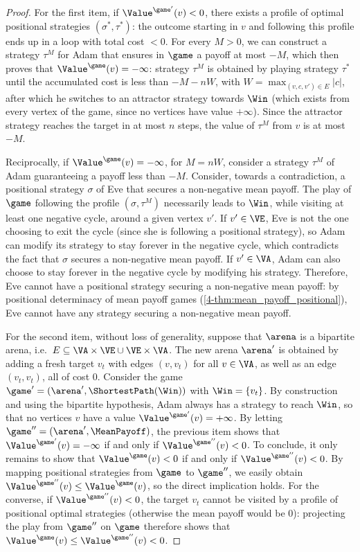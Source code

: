 \begin{proof}
  For the first item, if $\Value^{\game'}(v)<0$, there exists a
  profile of optimal positional strategies $(\sigma^*,\tau^*)$: the
  outcome starting in $v$ and following this profile ends up in a loop
  with total cost $<0$. For every $M>0$, we can construct a strategy
  $\tau^M$ for Adam that ensures in $\game$ a payoff at most $-M$,
  which then proves that $\Value^\game(v)=-\infty$: strategy $\tau^M$
  is obtained by playing strategy $\tau^*$ until the accumulated cost
  is less than $-M-nW$, with $W=\max_{(v,c,v')\in E} |c|$, after
  which he switches to an attractor strategy towards $\Win$ (which
  exists from every vertex of the game, since no vertices have value
  $+\infty$). Since the attractor strategy reaches the target in at
  most $n$ steps, the value of $\tau^M$ from $v$ is at most $-M$.

  Reciprocally, if $\Value^\game(v)=-\infty$, for $M=nW$,
  consider a strategy $\tau^M$ of Adam guaranteeing a payoff less than
  $-M$. Consider, towards a contradiction, a positional strategy
  $\sigma$ of Eve that secures a non-negative mean payoff. The play of
  $\game$ following the profile $(\sigma,\tau^M)$ necessarily leads to
  $\Win$, while visiting at least one negative cycle, around a given
  vertex $v'$. If $v'\in \VE$, Eve is not the one choosing to exit the
  cycle (since she is following a positional strategy), so Adam can
  modify its strategy to stay forever in the negative cycle, which
  contradicts the fact that $\sigma$ secures a non-negative
  mean payoff. If $v'\in \VA$, Adam can also choose to stay forever in
  the negative cycle by modifying his strategy. Therefore, Eve cannot
  have a positional strategy securing a non-negative mean payoff: by
  positional determinacy of mean payoff games
  (\cref{4-thm:mean_payoff_positional}), Eve cannot have any strategy securing
  a non-negative mean payoff.

  \medskip For the second item, without loss of generality, suppose
  that $\arena$ is a bipartite arena,
  i.e.~$E\subseteq \VA\times \VE\cup\VE\times \VA$. The new arena
  $\arena'$ is obtained by adding a fresh target $v_t$ with edges
  $(v,v_t)$ for all $v\in \VA$, as well as an edge $(v_t,v_t)$, all of
  cost 0. Consider the game $\game'=(\arena',\ShortestPath(\Win))$
  with $\Win = \{v_t\}$. By construction and using the bipartite
  hypothesis, Adam always has a strategy to reach $\Win$, so that no
  vertices $v$ have a value $\Value^{\game'}(v)=+\infty$. By letting
  $\game''=(\arena',\MeanPayoff)$, the previous item shows that
  $\Value^{\game'}(v)=-\infty$ if and only if
  $\Value^{\game''}(v)<0$. To conclude, it only remains to show that
  $\Value^{\game}(v)<0$ if and only if $\Value^{\game''}(v)<0$. By
  mapping positional strategies from $\game$ to $\game''$, we easily
  obtain $\Value^{\game''}(v)\leq \Value^\game(v)$, so the direct
  implication holds. For the converse, if $\Value^{\game''}(v)<0$, the
  target $v_t$ cannot be visited by a profile of positional optimal
  strategies (otherwise the mean payoff would be 0): projecting the
  play from $\game''$ on $\game$ therefore shows that
  $\Value^{\game}(v)\leq \Value^{\game''}(v) <0$. 
\end{proof}

